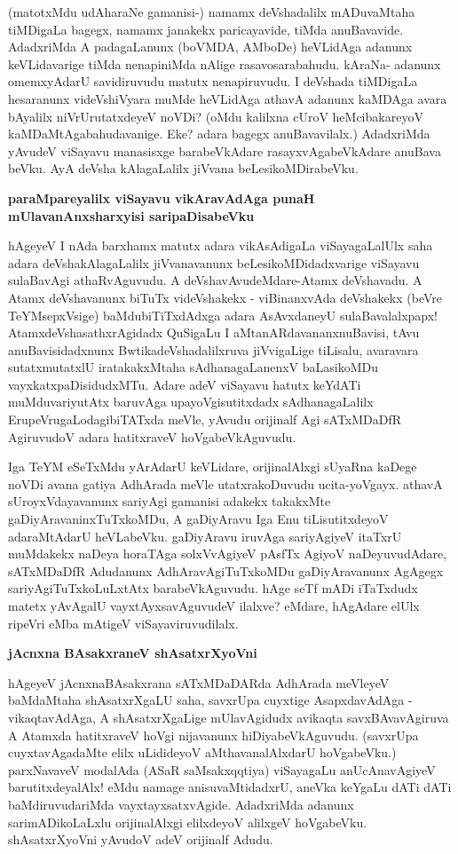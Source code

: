 \medskip

(matotxMdu udAharaNe gamanisi-) namamx deVshadalilx mADuvaMtaha tiMDigaLa bagegx, namamx janakekx paricayavide, tiMda anuBavavide. AdadxriMda A padagaLanunx (boVMDA, AMboDe) heVLidAga adanunx keVLidavarige tiMda nenapiniMda nAlige rasavosarabahudu. kAraNa- adanunx omemxyAdarU savidiru\-vudu matutx nenapiruvudu. I deVshada tiMDigaLa hesaranunx videVshiVyara muMde heVLidAga athavA adanunx kaMDAga avara bAyalilx niVrUrutatxdeyeV noVDi? (oMdu kalilxna cUroV heMcibakareyoV kaMDaMtAgabahudavanige. Eke? adara bagegx anuBavavilalx.) AdadxriMda yAvudeV viSayavu mana\-sisxge barabeVkAdare rasayxvAgabeVkAdare anuBava beVku. AyA deVsha kAlagaLalilx jiVvana beLesikoMDirabeVku.

{\bigskip
\noindent
{\large\bf paraMpareyalilx viSayavu vikAravAdAga punaH mUlavanAnxsharxyisi saripaDisabeVku}}
\medskip

\noindent
hAgeyeV I nAda barxhamx matutx adara vikAsAdigaLa viSayagaLalUlx saha adara deVshakAlagaLalilx jiVvanavanunx beLesikoMDidadxvarige viSayavu sulaBavAgi athaR\-vAguvudu. A deVshavAvudeMdare-Atamx deVshavadu. A Atamx deVshavanunx biTuTx \hbox{videVshakekx} - viBinanxvAda deVshakekx (beVre TeYMsepxVsige) baMdubiTiTx\-dAdxga adara AsAvxdaneyU sulaBavalalxpapx! AtamxdeVshasathxrAgidadx QuSigaLu I aMtanARdavananxnuBavisi, tAvu anuBavisidadxnunx BwtikadeVshadalilxruva jiVvigaLige tiLisalu, avaravara sutatx\-mutatxlU iratakakxMtaha sAdhana\-gaLanenxV baLasikoMDu vayxkatxpaDisidudxMTu. Adare adeV viSayavu hatutx keYdATi muMduvari\-yutAtx baruvAga upayoVgisutitxdadx sAdhanagaLalilx ErupeVrugaLodagibiTATxda meVle, yAvudu orijinalf Agi sATxMDaDfR AgiruvudoV adara hatitxraveV hoVgabeVkAguvudu.

Iga TeYM eSeTxMdu yArAdarU keVLidare, orijinalAlxgi sUyaRna kaDege noVDi avana gatiya AdhArada meVle utatxrakoDuvudu ucita-yoVgayx. athavA sUroyxVdayavanunx sariyAgi gama\-nisi adakekx takakxMte gaDiyAravaninxTuTxkoMDu, A gaDi\-yAravu Iga Enu tiLisutitxdeyoV adaraMtA\-darU heVLabeVku. gaDi\-yAravu iruvAga sariyAgiyeV itaTxrU muMdakekx naDeya horaTAga solxVvA\-giyeV pAsfTx AgiyoV  naDeyuvudAdare, sATxMDaDfR Adudanunx AdhAravAgiTuTxkoMDu gaDiyAra\-vanunx AgAgegx sariyAgiTuTxkoLuLxtAtx barabeVkAguvudu. hAge seTf mADi iTaTxdudx matetx yAvAgalU vayxtAyxsa\-vAgu\-vudeV ilalxve? eMdare, hAgAdare elUlx ripeVri eMba mAtigeV viSayaviruvudilalx.

{\bigskip
\noindent
{\large\bf jAcnxna BAsakxraneV shAsatxrXyoVni}}\label{page168}
\medskip

\noindent
hAgeyeV jAcnxnaBAsakxrana sATxMDaDARda AdhArada meVleyeV baMdaMtaha shAsatxrXgaLU saha, savxrUpa cuyxtige AsapxdavAdAga - vikaqtavAdAga, A shAsatxrXgaLige mUlavAgidudx avikaqta savxBAvavAgiruva A Atamxda hatitxraveV hoVgi nijavanunx hiDiyabeVkAguvudu. (savxrUpa cuyxtavAgadaMte elilx uLidideyoV aMthava\-nalAlxdarU hoVgabeVku.) parxNavaveV modalAda (ASaR saMsakxqqtiya) viSayagaLu anUcAna\-vAgiyeV barutitxdeyalAlx! eMdu namage anisuvaMtidadxrU, aneVka keYgaLu dATi dATi baMdiruvuda\-riMda vayxtayxsatx\-vAgide. AdadxriMda adanunx sarimADikoLaLxlu orijinalAlxgi elilxdeyoV alilxgeV hoVgabeVku. shAsatxrX\-yoVni yAvudoV adeV orijinalf Adudu.

